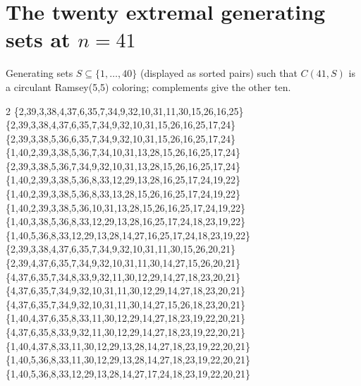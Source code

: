 \documentclass[11pt]{article}
\theoremstyle{remark}
\begin{document}
\section{The twenty extremal generating sets at $n=41$}\label{app:sets}
Generating sets $S\subseteq\{1,\dots,40\}$ (displayed as sorted pairs) such that
$C(41,S)$ is a circulant Ramsey(5,5) coloring; complements give the other ten.
\begin{multicols}{2}\small\ttfamily
\{2,39,3,38,4,37,6,35,7,34,9,32,10,31,11,30,15,26,16,25\}\\
\{2,39,3,38,4,37,6,35,7,34,9,32,10,31,15,26,16,25,17,24\}\\
\{2,39,3,38,5,36,6,35,7,34,9,32,10,31,15,26,16,25,17,24\}\\
\{1,40,2,39,3,38,5,36,7,34,10,31,13,28,15,26,16,25,17,24\}\\
\{2,39,3,38,5,36,7,34,9,32,10,31,13,28,15,26,16,25,17,24\}\\
\{1,40,2,39,3,38,5,36,8,33,12,29,13,28,16,25,17,24,19,22\}\\
\{1,40,2,39,3,38,5,36,8,33,13,28,15,26,16,25,17,24,19,22\}\\
\{1,40,2,39,3,38,5,36,10,31,13,28,15,26,16,25,17,24,19,22\}\\
\{1,40,3,38,5,36,8,33,12,29,13,28,16,25,17,24,18,23,19,22\}\\
\{1,40,5,36,8,33,12,29,13,28,14,27,16,25,17,24,18,23,19,22\}\\
\{2,39,3,38,4,37,6,35,7,34,9,32,10,31,11,30,15,26,20,21\}\\
\{2,39,4,37,6,35,7,34,9,32,10,31,11,30,14,27,15,26,20,21\}\\
\{4,37,6,35,7,34,8,33,9,32,11,30,12,29,14,27,18,23,20,21\}\\
\{4,37,6,35,7,34,9,32,10,31,11,30,12,29,14,27,18,23,20,21\}\\
\{4,37,6,35,7,34,9,32,10,31,11,30,14,27,15,26,18,23,20,21\}\\
\{1,40,4,37,6,35,8,33,11,30,12,29,14,27,18,23,19,22,20,21\}\\
\{4,37,6,35,8,33,9,32,11,30,12,29,14,27,18,23,19,22,20,21\}\\
\{1,40,4,37,8,33,11,30,12,29,13,28,14,27,18,23,19,22,20,21\}\\
\{1,40,5,36,8,33,11,30,12,29,13,28,14,27,18,23,19,22,20,21\}\\
\{1,40,5,36,8,33,12,29,13,28,14,27,17,24,18,23,19,22,20,21\}\\
\end{multicols}
\end{document}
